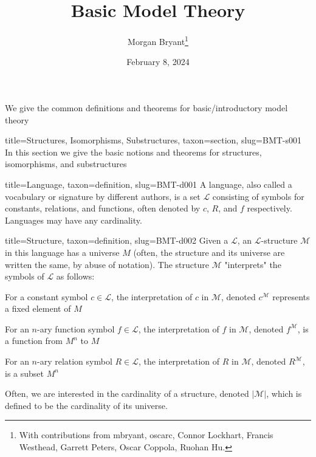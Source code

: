 \documentclass[a4paper]{article}
\title{Basic Model Theory}
\date{February 8, 2024}
\author{Morgan Bryant\thanks{With contributions from mbryant, oscarc, Connor Lockhart, Francis Westhead, Garrett Peters, Oscar Coppola, Ruohan Hu.}}
\begin{document}
\maketitle
\par{We give the common definitions and theorems for basic/introductory model theory}
  
  
\begin{tree}{title={Structures, Isomorphisms, Substructures}, taxon={section}, slug={BMT-s001}}
In this section we give the basic notions and theorems for structures, isomorphisms, and substructures
\begin{tree}{title={Language}, taxon={definition}, slug={BMT-d001}}
A language, also called a vocabulary or signature by different authors, is a set \(\mathcal {L}\) consisting of symbols for constants, relations, and functions, 
often denoted by \(c\), \(R\), and \(f\) respectively. Languages may have any cardinality.
\end{tree}

\begin{tree}{title={Structure}, taxon={definition}, slug={BMT-d002}}
Given a  \(\mathcal {L}\), an \(\mathcal {L}\)-structure \(\mathcal {M}\) in this language has a universe \(M\) (often, the structure and its universe 
are written the same, by abuse of notation). The structure \(\mathcal {M}\) "interprets" the symbols of \(\mathcal {L}\) as follows:\par{For a constant symbol \(c \in   \mathcal {L}\), the interpretation of \(c\) in \(\mathcal {M}\), denoted \(c^{ \mathcal {M}}\) represents a fixed 
element of \(M\)}\par{For an \(n\)-ary function symbol \(f \in   \mathcal {L}\), the interpretation of \(f\) in \(\mathcal {M}\), denoted \(f^{ \mathcal {M}}\),
is a function from \(M^n\) to \(M\)}\par{For an \(n\)-ary relation symbol \(R \in   \mathcal {L}\), the interpretation of \(R\) in \(\mathcal {M}\), denoted \(R^{ \mathcal {M}}\),
is a subset \(M^n\)}\par{Often, we are interested in the cardinality of a structure, denoted \(| \mathcal {M}|\), which is defined to be the cardinality of its universe.}
\end{tree}


\end{tree}
\end{document}

